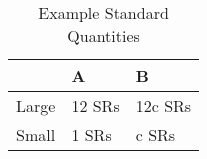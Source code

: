 \begin{table}[] \centering
\caption{Example Standard Quantities}
\label{tab:identification2}
\begin{tabular}{lll}
            & \textbf{A} & \textbf{B} \\
\hline
Large     & 12 SRs         & 12c SRs  \\
Small      & 1 SRs         & c SRs  \\
\end{tabular}
\end{table}
